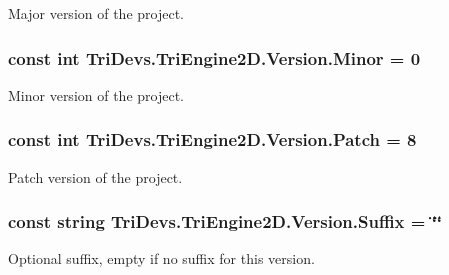 Major version of the project. 

\hypertarget{class_tri_devs_1_1_tri_engine2_d_1_1_version_a46c99b37d8caad10a9702e9823f6cded}{
\subsubsection[{Minor}]{\setlength{\rightskip}{0pt plus 5cm}const int Tri\-Devs.\-Tri\-Engine2\-D.\-Version.\-Minor = 0}}\label{class_tri_devs_1_1_tri_engine2_d_1_1_version_a46c99b37d8caad10a9702e9823f6cded}


Minor version of the project. 

\hypertarget{class_tri_devs_1_1_tri_engine2_d_1_1_version_a5baa982b0404ea5ed3d2526e26f55809}{
\subsubsection[{Patch}]{\setlength{\rightskip}{0pt plus 5cm}const int Tri\-Devs.\-Tri\-Engine2\-D.\-Version.\-Patch = 8}}\label{class_tri_devs_1_1_tri_engine2_d_1_1_version_a5baa982b0404ea5ed3d2526e26f55809}


Patch version of the project. 

\hypertarget{class_tri_devs_1_1_tri_engine2_d_1_1_version_a5f7a61ae54163decac64e6acbe25e76d}{
\subsubsection[{Suffix}]{\setlength{\rightskip}{0pt plus 5cm}const string Tri\-Devs.\-Tri\-Engine2\-D.\-Version.\-Suffix = \char`\"{}\char`\"{}}}\label{class_tri_devs_1_1_tri_engine2_d_1_1_version_a5f7a61ae54163decac64e6acbe25e76d}


Optional suffix, empty if no suffix for this version. 

